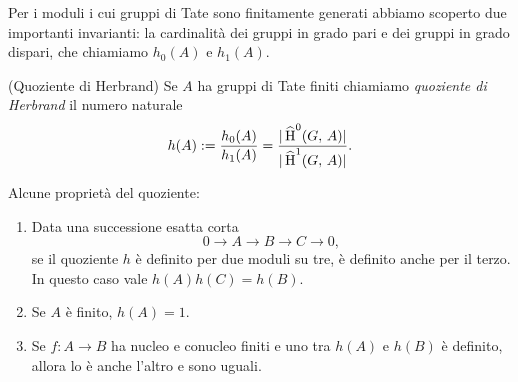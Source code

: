 Per i moduli i cui gruppi di Tate sono finitamente generati abbiamo scoperto due importanti invarianti: la cardinalità dei gruppi in grado pari e dei gruppi in grado dispari, che chiamiamo $ h_0(A) $ e $ h_1(A) $.

\begin{definition}(Quoziente di Herbrand)
	Se $ A $ ha gruppi di Tate finiti chiamiamo \emph{quoziente di Herbrand} il numero naturale
	\[ {h}(A) := \frac{h_0(A)}{h_1(A)} = \frac{|\operatorname{\widehat{H}}^0(G, \, A)|}{|\operatorname{\widehat{H}}^1(G, \, A)|}. \]
\end{definition}

\begin{proposition}[Herbrand]
	Alcune proprietà del quoziente:
	\begin{enumerate}
		\item Data una successione esatta corta
		\[ 0 \to A \to B \to C \to 0, \]
		se il quoziente $ h $ è definito per due moduli su tre, è definito anche per il terzo. In questo caso vale $ h(A)h(C) = h(B) $.
		\item Se $ A $ è finito, $ h(A) = 1 $.
		\item Se $ f \colon A \to B $ ha nucleo e conucleo finiti e uno tra $ h(A) $ e $h(B) $ è definito, allora lo è anche l'altro e sono uguali.
	\end{enumerate}
\end{proposition}

